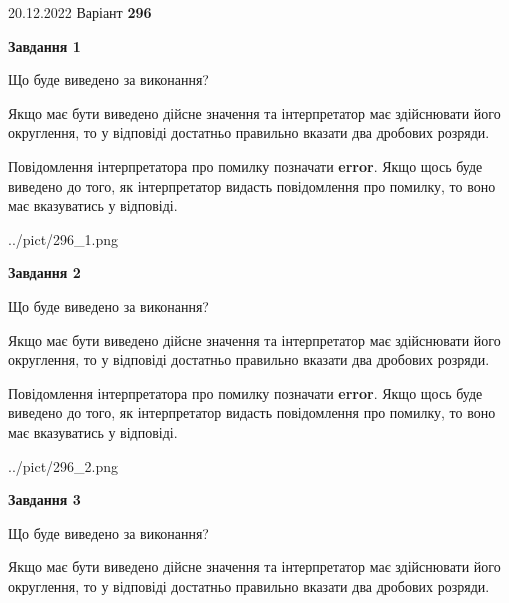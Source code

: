 \documentclass[12pt, ukrainian]{article}
\begin{document}
{20.12.2022 Варіант \No \textbf { 296 }\par}
{
\begin {Large}

{\begin {center}\textbf{Завдання 1}\end {center}}\par
Що буде виведено за виконання? \par

Якщо має бути виведено дійсне значення та інтерпретатор має здійснювати його округлення, 
то у відповіді достатньо правильно вказати два дробових розряди.

Повідомлення інтерпретатора про помилку позначати \textbf{error}.
Якщо щось буде виведено до того, як інтерпретатор видасть повідомлення про помилку, 
то воно має вказуватись у відповіді. \par

\begin{center}
	{../pict/296_1.png}
\end{center}
\newpage

{\begin {center}\textbf{Завдання 2}\end {center}}\par
Що буде виведено за виконання? \par

Якщо має бути виведено дійсне значення та інтерпретатор має здійснювати його округлення, 
то у відповіді достатньо правильно вказати два дробових розряди.

Повідомлення інтерпретатора про помилку позначати \textbf{error}.
Якщо щось буде виведено до того, як інтерпретатор видасть повідомлення про помилку, 
то воно має вказуватись у відповіді. \par

\begin{center}
	{../pict/296_2.png}
\end{center}
\newpage

{\begin {center}\textbf{Завдання 3}\end {center}}\par
Що буде виведено за виконання? \par

Якщо має бути виведено дійсне значення та інтерпретатор має здійснювати його округлення, 
то у відповіді достатньо правильно вказати два дробових розряди.


\end{Large}}
\end{document}

